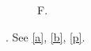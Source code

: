 \documentclass{article}
\begin{document}
\begin{figure}
\caption{F.}
\end{figure}
\begin{listing}
\caption{Both.}\label{l}
\end{listing}
\makeatletter\sf@counterlist\makeatother.
See \ref{a}, \ref{b}, \ref{p}.
\end{document}
